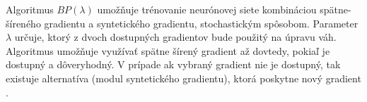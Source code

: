 Algoritmus $BP(\lambda)$ umožňuje trénovanie neurónovej siete kombináciou spätne-šíreného gradientu a syntetického gradientu, stochastickým spôsobom. Parameter $\lambda$ určuje, ktorý z dvoch dostupných gradientov bude použitý na úpravu váh. Algoritmus umožňuje využívať spätne šírený gradient až dovtedy, pokiaľ je dostupný a dôveryhodný. V prípade ak vybraný gradient nie je dostupný, tak existuje alternatíva (modul syntetického gradientu), ktorá poskytne nový gradient \cite{Jaderberg2016}.

